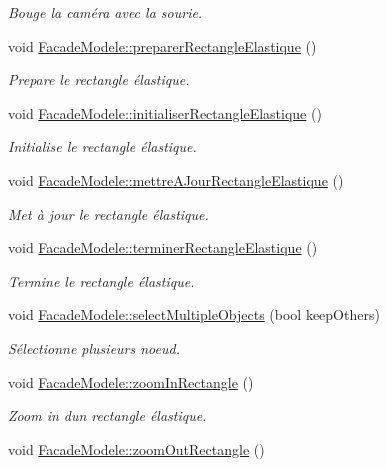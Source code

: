 \begin{DoxyCompactItemize}
\begin{DoxyCompactList}\small\item\em Bouge la caméra avec la sourie. \end{DoxyCompactList}\item 
void \hyperlink{group__inf2990_gaa5ea001f334158926e6c701478926ae9}{Facade\+Modele\+::preparer\+Rectangle\+Elastique} ()
\begin{DoxyCompactList}\small\item\em Prepare le rectangle élastique. \end{DoxyCompactList}\item 
void \hyperlink{group__inf2990_ga6ccf25bd92d3bae6dfeebaf051c768f4}{Facade\+Modele\+::initialiser\+Rectangle\+Elastique} ()
\begin{DoxyCompactList}\small\item\em Initialise le rectangle élastique. \end{DoxyCompactList}\item 
void \hyperlink{group__inf2990_ga382ae0540038d9ef65673af9d5d1b164}{Facade\+Modele\+::mettre\+A\+Jour\+Rectangle\+Elastique} ()
\begin{DoxyCompactList}\small\item\em Met à jour le rectangle élastique. \end{DoxyCompactList}\item 
void \hyperlink{group__inf2990_ga1c99d4d88f05b70a20b36b51c07f31cf}{Facade\+Modele\+::terminer\+Rectangle\+Elastique} ()
\begin{DoxyCompactList}\small\item\em Termine le rectangle élastique. \end{DoxyCompactList}\item 
void \hyperlink{group__inf2990_ga7cbdab19081ab5e385cff2862e0642cd}{Facade\+Modele\+::select\+Multiple\+Objects} (bool keep\+Others)
\begin{DoxyCompactList}\small\item\em Sélectionne plusieurs noeud. \end{DoxyCompactList}\item 
void \hyperlink{group__inf2990_ga10c88f159ad8d8ff9b17927d7ca50a0e}{Facade\+Modele\+::zoom\+In\+Rectangle} ()
\begin{DoxyCompactList}\small\item\em Zoom in d\textquotesingle{}un rectangle élastique. \end{DoxyCompactList}\item 
void \hyperlink{group__inf2990_ga9b2a60b7b9392f6284e2fb7560e9c7f8}{Facade\+Modele\+::zoom\+Out\+Rectangle} ()

\end{DoxyCompactItemize}
